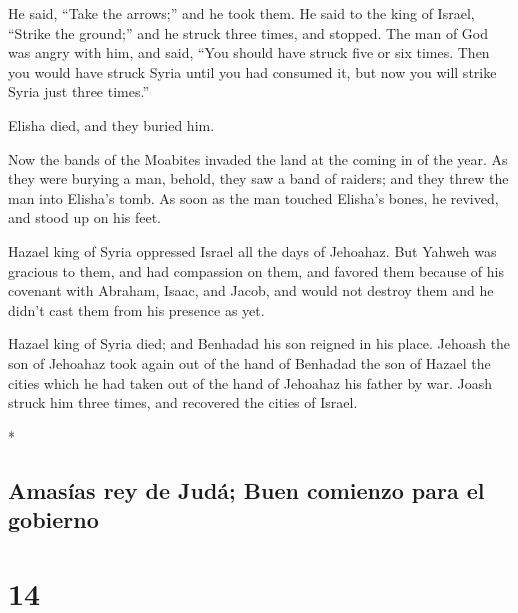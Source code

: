 \begin{paracol}{2}
\begin{otherlanguage}{english}
 He said, ``Take the arrows;'' and he took them. He said
to the king of Israel, ``Strike the ground;'' and he struck three times,
and stopped.  The man of God was angry with him, and
said, ``You should have struck five or six times. Then you would have
struck Syria until you had consumed it, but now you will strike Syria
just three times.''

 Elisha died, and they buried him.

Now the bands of the Moabites invaded the land at the coming in of the
year.  As they were burying a man, behold, they saw a
band of raiders; and they threw the man into Elisha's tomb. As soon as
the man touched Elisha's bones, he revived, and stood up on his feet.

 Hazael king of Syria oppressed Israel all the days of
Jehoahaz.  But Yahweh was gracious to them, and had
compassion on them, and favored them because of his covenant with
Abraham, Isaac, and Jacob, and would not destroy them and he didn't cast
them from his presence as yet.

 Hazael king of Syria died; and Benhadad his son reigned
in his place.  Jehoash the son of Jehoahaz took again out
of the hand of Benhadad the son of Hazael the cities which he had taken
out of the hand of Jehoahaz his father by war. Joash struck him three
times, and recovered the cities of Israel.

\end{otherlanguage}

\switchcolumn[0]*

\hypertarget{amasuxedas-rey-de-juduxe1-buen-comienzo-para-el-gobierno}{%
\subsection{Amasías rey de Judá; Buen comienzo para el
gobierno}\label{amasuxedas-rey-de-juduxe1-buen-comienzo-para-el-gobierno}}

\hypertarget{section-26}{%
\section{14}\label{section-26}}


\end{paracol}
